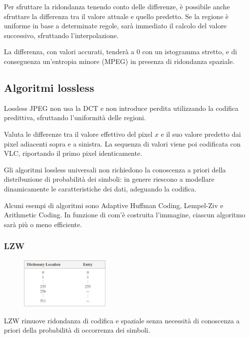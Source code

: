 Per sfruttare la ridondanza tenendo conto delle differenze, è possibile anche sfruttare la differenza tra il valore attuale e quello predetto. Se la regione è uniforme in base a determinate regole, sarà immediato il calcolo del valore successivo, sfruttando l'interpolazione. 

La differenza, con valori accurati, tenderà a 0 con un istogramma stretto, e di conseguenza un'entropia minore (MPEG) in presenza di ridondanza spaziale. 

\subsection{Algoritmi lossless}
Lossless JPEG non usa la DCT e non introduce perdita utilizzando la codifica predittiva, sfruttando l'uniformità delle regioni. 

Valuta le differenze tra il valore effettivo del pixel $x$ e il suo valore predetto dai pixel adiacenti sopra e a sinistra. La sequenza di valori viene poi codificata con VLC, riportando il primo pixel identicamente. 

Gli algoritmi lossless universali non richiedono la conoscenza a priori della distribuzione di probabilità dei simboli: in genere riescono a modellare dinamicamente le caratteristiche dei dati, adeguando la codifica.

Alcuni esempi di algoritmi sono Adaptive Huffman Coding, Lempel-Ziv e Arithmetic Coding. In funzione di com'è costruita l'immagine, ciascun algoritmo sarà più o meno efficiente. 

\newpage
\subsubsection{LZW}
 \begin{figure}
	\vspace{-15pt}
	\includegraphics[width=0.4\textwidth]{Lezioni/Immagini/dizionario}
	\vspace{-20pt}
\end{figure}

LZW rimuove ridondanza di codifica e spaziale senza necessità di conoscenza a priori della probabilità di occorrenza dei simboli.

